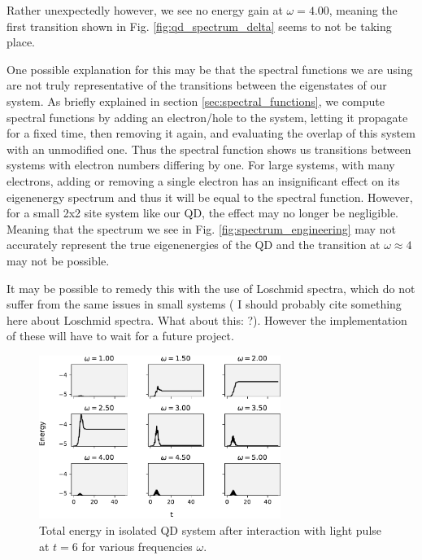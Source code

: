 \medskip

Rather unexpectedly however, we see no energy gain at $\omega = 4.00$, meaning the first transition shown in Fig. \ref{fig:qd_spectrum_delta} seems to not be taking place.

\medskip

One possible explanation for this may be that the spectral functions we are using are not truly representative of the transitions between the eigenstates of our system. As briefly explained in section \ref{sec:spectral_functions}, we compute spectral functions by adding an electron/hole to the system, letting it propagate for a fixed time, then removing it again, and evaluating the overlap of this system with an unmodified one. Thus the spectral function shows us transitions between systems with electron numbers differing by one. For large systems, with many electrons, adding or removing a single electron has an insignificant effect on its eigenenergy spectrum and thus it will be equal to the spectral function. However, for a small 2x2 site system like our QD, the effect may no longer be negligible. Meaning that the spectrum we see in Fig. \ref{fig:spectrum_engineering} may not accurately represent the true eigenenergies of the QD and the transition at $\omega\approx 4$ may not be possible.

\medskip
It may be possible to remedy this with the use of Loschmid spectra, which do not suffer from the same issues in small systems ({\color{red} I should probably cite something here about Loschmid spectra. What about this: \cite{loschmidt}?}). However the implementation of these will have to wait for a future project. 

\medskip

\begin{figure}[!hbt]
    \centering
    \includegraphics[width=0.7\textwidth]{graph/9test.pdf}
    \caption{Total energy in isolated QD system after interaction with light pulse at $t=6$ for various frequencies $\omega$.}
    \label{fig:qd_9_total_energy}
\end{figure}